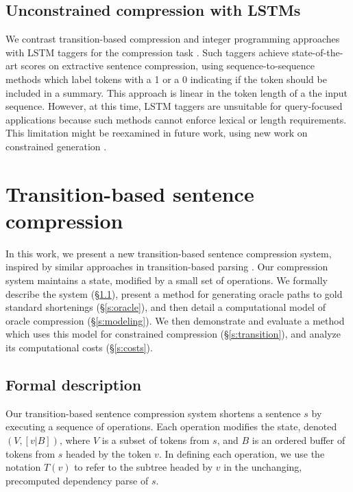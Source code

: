 \documentclass[11pt,a4paper]{article}
\begin{document}
\subsection{Unconstrained compression with LSTMs}

We contrast transition-based compression and integer programming approaches with LSTM taggers for the compression task \cite{filippova2015sentence}. Such taggers achieve state-of-the-art scores on extractive sentence compression, using sequence-to-sequence methods which label tokens with a 1 or a 0 indicating if the token should be included in a summary. This approach is linear in the token length of a the input sequence. However, at this time, LSTM taggers are unsuitable for query-focused applications because such methods cannot enforce lexical or length requirements. This limitation might be reexamined in future work, using new work on constrained generation \cite{N18-1119,aaimh}.

\section{Transition-based sentence compression}\label{s:system}

In this work, we present a new transition-based sentence compression system, inspired by similar approaches in transition-based parsing \cite{nivre2003,D14-1082}. Our compression system maintains a state, modified by a small set of operations. We formally describe the system (\S\ref{s:formal}), present a method for generating oracle paths to gold standard shortenings (\S\ref{s:oracle}), and then detail a computational model of oracle compression (\S\ref{s:modeling}). We then demonstrate and evaluate a method which uses this model for constrained compression (\S\ref{s:transition}), and analyze its computational costs (\S\ref{s:costs}).

\subsection{Formal description}\label{s:formal}

Our transition-based sentence compression system shortens a sentence $s$ by executing a sequence of operations. Each operation modifies the state, denoted $(V,[v|B])$, where $V$ is a subset of tokens from $s$, and $B$ is an ordered buffer of tokens from $s$ headed by the token $v$. In defining each operation, we use the notation $T(v)$ to refer to the subtree headed by $v$ in the unchanging, precomputed dependency parse of $s$.
\end{document}
